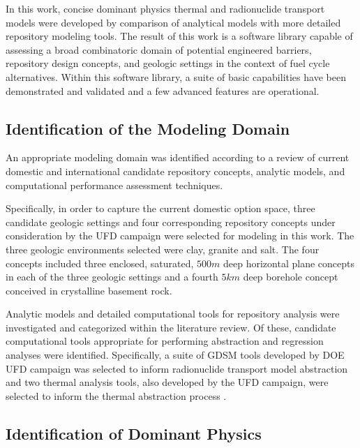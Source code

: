 
In this work, concise dominant physics thermal and radionuclide transport models 
were developed by comparison of analytical models with more detailed repository 
modeling tools. The result of this work is a software library capable of 
assessing a broad combinatoric domain of potential engineered barriers, 
repository design concepts, and geologic settings in the context of fuel cycle 
alternatives. Within this software library, a suite of basic capabilities have 
been demonstrated and validated and a few advanced features are operational. 

\subsection{Identification of the Modeling Domain}

An appropriate modeling domain was identified according to a review of current 
domestic and international candidate repository concepts, analytic models, and 
computational performance assessment techniques.  

Specifically, in order to capture the current domestic option space, three 
candidate geologic settings and four corresponding repository concepts under 
consideration by the \gls{UFD} campaign were selected for modeling in 
this work. The three geologic environments selected were clay, granite and salt.  
The four concepts included three enclosed, saturated, $500m$ deep horizontal 
plane concepts in each of the three geologic settings and a fourth $5km$ deep 
borehole concept conceived in crystalline basement rock.


Analytic models and detailed computational tools for repository analysis were 
investigated and categorized within the literature review.  Of these, candidate 
computational tools appropriate for performing abstraction and regression 
analyses were identified. Specifically, a suite of \gls{GDSM} tools developed by
\gls{DOE} \gls{UFD} campaign was selected to inform radionuclide transport model 
abstraction\cite{clayton_generic_2011} and two thermal analysis tools, also 
developed by the \gls{UFD} 
campaign, were selected to inform the thermal abstraction process 
\cite{huff_benchmarking_2012, huff_numerical_2012, greenberg_application_2012}.


\subsection{Identification of Dominant Physics}

